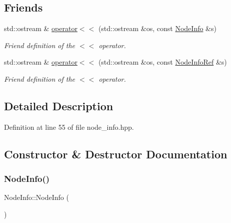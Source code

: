 \subsection*{Friends}
\begin{DoxyCompactItemize}
\item 
std\+::ostream \& \hyperlink{structNodeInfo_a4da12b8cecabbd10bf8e23b935adfc0b}{operator$<$$<$} (std\+::ostream \&os, const \hyperlink{structNodeInfo}{Node\+Info} \&s)
\begin{DoxyCompactList}\small\item\em Friend definition of the $<$$<$ operator. \end{DoxyCompactList}\item 
std\+::ostream \& \hyperlink{structNodeInfo_ac7d764c3c02da98c48d2395ceca5f5e6}{operator$<$$<$} (std\+::ostream \&os, const \hyperlink{node__info_8hpp_a345f052eed4efe04f7848fd0ebd015b2}{Node\+Info\+Ref} \&s)
\begin{DoxyCompactList}\small\item\em Friend definition of the $<$$<$ operator. \end{DoxyCompactList}\end{DoxyCompactItemize}


\subsection{Detailed Description}


Definition at line 55 of file node\+\_\+info.\+hpp.



\subsection{Constructor \& Destructor Documentation}
\mbox{\label{structNodeInfo_afef392e4c27930503179a6ed868a53dd}} 
\subsubsection{\texorpdfstring{Node\+Info()}{NodeInfo()}}
{\footnotesize\ttfamily Node\+Info\+::\+Node\+Info (\begin{DoxyParamCaption}{ }\end{DoxyParamCaption})\hspace{0.3cm}{\ttfamily [default]}}



